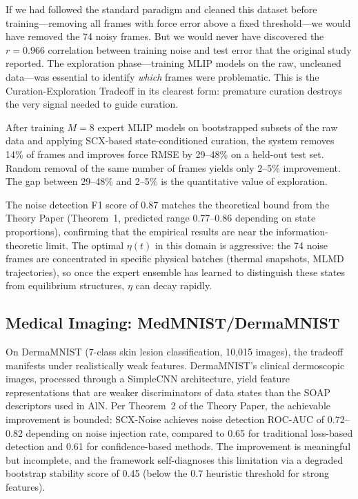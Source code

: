 \documentclass{article}
\begin{document}
If we had followed the standard paradigm and cleaned this dataset before training---removing all frames with force error above a fixed threshold---we would have removed the 74 noisy frames. But we would never have discovered the $r = 0.966$ correlation between training noise and test error that the original study reported. The exploration phase---training MLIP models on the raw, uncleaned data---was essential to identify \emph{which} frames were problematic. This is the Curation-Exploration Tradeoff in its clearest form: premature curation destroys the very signal needed to guide curation.

After training $M = 8$ expert MLIP models on bootstrapped subsets of the raw data and applying SCX-based state-conditioned curation, the system removes 14\% of frames and improves force RMSE by 29--48\% on a held-out test set. Random removal of the same number of frames yields only 2--5\% improvement. The gap between 29--48\% and 2--5\% is the quantitative value of exploration.

The noise detection F1 score of 0.87 matches the theoretical bound from the Theory Paper (Theorem~1, predicted range 0.77--0.86 depending on state proportions), confirming that the empirical results are near the information-theoretic limit. The optimal $\eta(t)$ in this domain is aggressive: the 74 noise frames are concentrated in specific physical batches (thermal snapshots, MLMD trajectories), so once the expert ensemble has learned to distinguish these states from equilibrium structures, $\eta$ can decay rapidly.

\subsection{Medical Imaging: MedMNIST/DermaMNIST}
\label{sec:medical}

On DermaMNIST (7-class skin lesion classification, 10,015 images), the tradeoff manifests under realistically weak features. DermaMNIST's clinical dermoscopic images, processed through a SimpleCNN architecture, yield feature representations that are weaker discriminators of data states than the SOAP descriptors used in AlN. Per Theorem~2 of the Theory Paper, the achievable improvement is bounded: SCX-Noise achieves noise detection ROC-AUC of 0.72--0.82 depending on noise injection rate, compared to 0.65 for traditional loss-based detection and 0.61 for confidence-based methods. The improvement is meaningful but incomplete, and the framework self-diagnoses this limitation via a degraded bootstrap stability score of 0.45 (below the 0.7 heuristic threshold for strong features).
\end{document}
